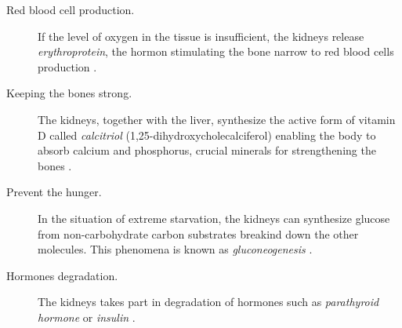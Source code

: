 \begin{description}
	\item [Red blood cell production.] If the level of oxygen in the tissue is insufficient, the kidneys release \textit{erythroprotein}, the hormon stimulating the bone narrow to red blood cells production \cite{donnelly2001erythropoietin}. 

\item [Keeping the bones strong.] The kidneys, together with the liver, synthesize the active form of vitamin D called \textit{calcitriol} (1,25-dihydroxycholecalciferol) enabling the body to absorb calcium and phosphorus, crucial minerals for strengthening the bones \cite{williams2009vitamin}.

\item [Prevent the hunger.] In the situation of extreme starvation, the kidneys can synthesize glucose from non-carbohydrate carbon substrates breakind down the other molecules. This phenomena is known as \textit{gluconeogenesis} \cite{newsholme1967control}.

\item [Hormones degradation.] The kidneys takes part in degradation of hormones such as \textit{parathyroid hormone} or \textit{insulin} \cite{emmanouel1980role}. 
%					
	\end{description} 

